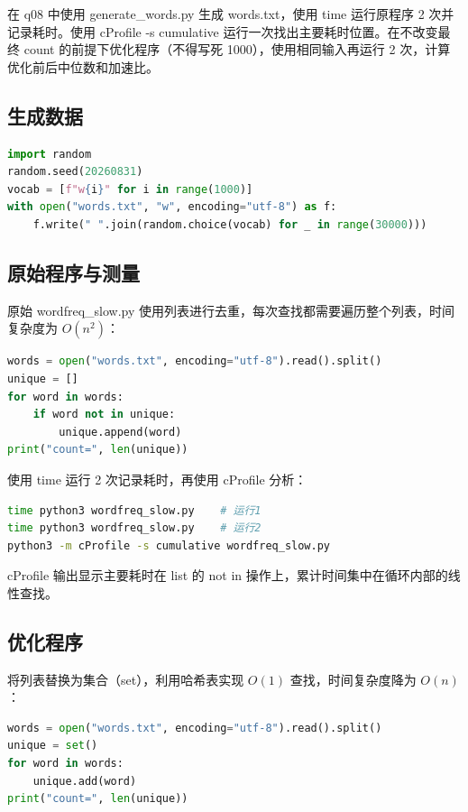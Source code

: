 \documentclass[UTF8]{ctexart}
\begin{document}
在 q08 中使用 generate\_words.py 生成 words.txt，使用 time 运行原程序 2 次并记录耗时。使用 cProfile -s cumulative 运行一次找出主要耗时位置。在不改变最终 count 的前提下优化程序（不得写死 1000），使用相同输入再运行 2 次，计算优化前后中位数和加速比。

\subsection{生成数据}

\begin{lstlisting}[language=Python]
import random
random.seed(20260831)
vocab = [f"w{i}" for i in range(1000)]
with open("words.txt", "w", encoding="utf-8") as f:
    f.write(" ".join(random.choice(vocab) for _ in range(30000)))
\end{lstlisting}

\subsection{原始程序与测量}

原始 wordfreq\_slow.py 使用列表进行去重，每次查找都需要遍历整个列表，时间复杂度为 $O(n^2)$：

\begin{lstlisting}[language=Python]
words = open("words.txt", encoding="utf-8").read().split()
unique = []
for word in words:
    if word not in unique:
        unique.append(word)
print("count=", len(unique))
\end{lstlisting}

使用 time 运行 2 次记录耗时，再使用 cProfile 分析：

\begin{lstlisting}[language=bash]
time python3 wordfreq_slow.py    # 运行1
time python3 wordfreq_slow.py    # 运行2
python3 -m cProfile -s cumulative wordfreq_slow.py
\end{lstlisting}

cProfile 输出显示主要耗时在 list 的 not in 操作上，累计时间集中在循环内部的线性查找。

\subsection{优化程序}

将列表替换为集合（set），利用哈希表实现 $O(1)$ 查找，时间复杂度降为 $O(n)$：

\begin{lstlisting}[language=Python]
words = open("words.txt", encoding="utf-8").read().split()
unique = set()
for word in words:
    unique.add(word)
print("count=", len(unique))
\end{lstlisting}
\end{document}
